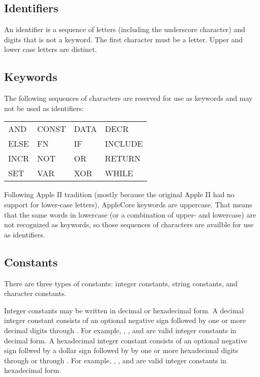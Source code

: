 \documentclass[10pt]{article}
\begin{document}
\subsection{Identifiers}\label{Identifiers}

An identifier is a sequence of letters (including the underscore
character) and digits that is not a keyword.  The first character must
be a letter.  Upper and lower case letters are distinct.

\subsection{Keywords}

The following sequences of characters are reserved for use as keywords
and may not be used as identifiers:
\begin{ttfamily}
\begin{center}
\begin{tabular}{l l l l}
AND & CONST & DATA & DECR \\
%
ELSE & FN & IF & INCLUDE \\
%
INCR & NOT & OR & RETURN \\
%
SET & VAR & XOR & WHILE \\
\end{tabular}
\end{center}
\end{ttfamily}

Following Apple II tradition (mostly because the original Apple II had
no support for lower-case letters), AppleCore keywords are uppercase.
That means that the same words in lowercase (or a combination of
upper- and lowercase) are not recognized as keywords, so those
sequences of characters are availble for use as identifiers.

\subsection{Constants}\label{constants}

There are three types of constants: integer constants, string
constants, and character constants.  

  Integer constants may be written in
decimal or hexadecimal form.  A decimal integer constant consists of
an optional negative sign \kwd{-} followed by one or more decimal
digits  through .  For example, , , and
 are valid integer constants in decimal form.  A hexadecimal
integer constant consists of an optional negative sign \kwd{-} follwed
by a dollar sign \kwd{\$} followed by by one or more hexadecimal
digits  through  or  through .  For
example, , , and  are valid integer
constants in hexadecimal form.
\end{document}
